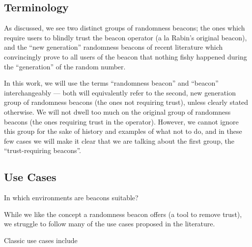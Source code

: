 

\subsection{Terminology}
As discussed, we see two distinct groups of randomness beacons; the ones which require users to blindly trust the beacon operator (a la Rabin's original beacon), and the \enquote{new generation} randomness beacons of recent literature which convincingly prove to all users of the beacon that nothing fishy happened during the \enquote{generation} of the random number.

In this work, we will use the terms \enquote{randomness beacon} and \enquote{beacon} interchangeably --- both will equivalently refer to the second, new generation group of randomness beacons (the ones not requiring trust), unless clearly stated otherwise.
We will not dwell too much on the original group of randomness beacons (the ones requiring trust in the operator). However, we cannot ignore this group for the sake of history and examples of what not to do, and in these few cases we will make it clear that we are talking about the first group, the \enquote{trust-requiring beacons}.

\subsection{Use Cases}

In which environments are beacons suitable? 


While we like the concept a randomness beacon offers (a tool to remove trust), we struggle to follow many of the use cases proposed in the literature.

Classic use cases include 


